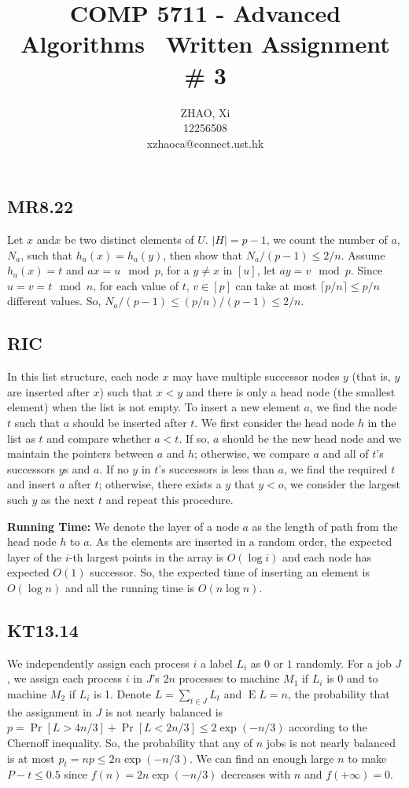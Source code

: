 \documentclass[12pt,onecolumn,a4paper]{article}
\title{\textbf{COMP 5711 - Advanced Algorithms} \ \textbf{Written Assignment \# 3}}
\author{ZHAO, Xi \\12256508 \\xzhaoca@connect.ust.hk}
\DeclareMathOperator{\E}{E}
\begin{document}
\maketitle

\subsection*{MR8.22}
Let $x$ and$x$ be two distinct elements of $U$. $|H|=p-1$, we count the number of $a$, $N_a$, such that $h_a(x)=h_a(y)$, then show that $N_a/(p-1)\le 2/n$.
Assume $h_a(x)=t$ and $ax=u \mod p$, for a $y\neq x$ in $[u]$, let $ay=v \mod p$. Since $u=v=t\mod n$, for each value of $t$, $v\in [p]$ can take at most $\lceil p/n \rceil\le p/n$ different values. So, $N_a/(p-1)\le (p/n)/(p-1)\le 2/n.$

\subsection*{RIC}
In this list structure, each node $x$ may have multiple successor nodes $y$ (that is, $ y $ are inserted after $x$) such that $x<y$ and there is only a head node (the smallest element) when the list is not empty. To insert a new element $a$, we find the node $t$ such that $a$ should be inserted after $t$. We first consider the head node $h$ in the list as $t$ and compare whether $a<t$. If so, $a$ should be the new head node and we maintain the pointers between $a$ and $h$; otherwise, we compare $a$ and all of $t$'s successors $y$s and $a$. If no $y$ in $t$'s successors is less than $a$, we find the required $t$ and insert $a$ after $t$;
otherwise, there exists a $y$ that $y<o$, we consider the largest such $y$ as the next $t$ and repeat this procedure.

\textbf{Running Time:} We denote the layer of a node $a$ as the length of path from the head node $h$ to $a$. As the elements are inserted in a random order, the expected layer of the $i$-th largest points in the array is $O(\log i)$ and each node has expected $O(1)$ successor. So, the expected time of inserting an element is $O(\log n)$ and all the running time is $O(n\log n)$.
\subsection*{KT13.14}
We independently assign each process $i$ a label $L_i$ as $0$ or $1$ randomly. For a job $J$, we assign each process $i$ in $J$'s $2n$ processes to machine $M_1$ if $L_i$ is 0 and to machine $M_2$ if $L_i$ is 1. 
Denote $L=\sum_{t\in J}^{ } L_t$ and $\E L=n$, the probability that the assignment in $J$ is not nearly balanced is $p=\Pr[L>4n/3]+\Pr[L<2n/3]\le 2\exp(-n/3)$ according to the Chernoff inequality. So, the probability that any of $n$ jobs is not nearly balanced is at most $p_t=np\le 2n\exp(-n/3)$. We can find an enough large $n$ to make $P-t\le 0.5$ since $f(n)=2n\exp(-n/3)$ decreases with $n$ and $f(+\infty)=0$.
\end{document}
